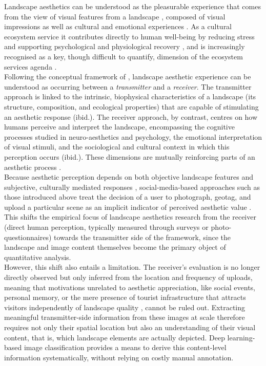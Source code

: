 \documentclass[hidelinks, 11pt]{article}
\begin{document}
Landscape aesthetics can be understood as the pleasurable experience that comes from the view of visual features from a landscape \citep{tribot_integrating_2018}, composed of visual impressions as well as cultural and emotional experiences \citep{bourassa_toward_1988}. As a cultural ecosystem service it contributes directly to human well-being by reducing stress and supporting psychological and physiological recovery \citep{gobster_shared_2007}, and is increasingly recognised as a key, though difficult to quantify, dimension of the ecosystem services agenda \citep{daniel_contributions_2012}.
\\
Following the conceptual framework of \citep{tribot_integrating_2018}, landscape aesthetic experience can be understood as occurring between a \textit{transmitter} and a \textit{receiver}. The transmitter approach is linked to the intrinsic, biophysical characteristics of a landscape (its structure, composition, and ecological properties) that are capable of stimulating an aesthetic response (ibid.). The receiver approach, by contrast, centres on how humans perceive and interpret the landscape, encompassing the cognitive processes studied in neuro-aesthetics and psychology, the emotional interpretation of visual stimuli, and the sociological and cultural context in which this perception occurs (ibid.). These  dimensions are mutually reinforcing parts of an aesthetic process \citep{gobster_shared_2007,tribot_integrating_2018}.
\\
Because aesthetic perception depends on both objective landscape features and subjective, culturally mediated responses \citep{daniel_whither_2001,zhang_assessment_2022}, social-media-based approaches such as those introduced above \citep{tieskens_aesthetic_2018} treat the decision of a user to photograph, geotag, and upload a particular scene as an implicit indicator of perceived aesthetic value \citep{langemeyer_mapping_2018}. This shifts the empirical focus of landscape aesthetics research from the receiver (direct human perception, typically measured through surveys or photo-questionnaires) towards the transmitter side of the framework, since the landscape and image content themselves become the primary object of quantitative analysis.
\\
However, this shift also entails a limitation. The receiver's evaluation is no longer directly observed but only inferred from the location and frequency of uploads, meaning that motivations unrelated to aesthetic appreciation, like social events, personal memory, or the mere presence of tourist infrastructure that attracts visitors independently of landscape quality \citep{tieskens_aesthetic_2018}, cannot be ruled out. Extracting meaningful transmitter-side information from these images at scale therefore requires not only their spatial location but also an understanding of their visual content, that is, which landscape elements are actually depicted. Deep learning-based image classification provides a means to derive this content-level information systematically, without relying on costly manual annotation.
\end{document}
